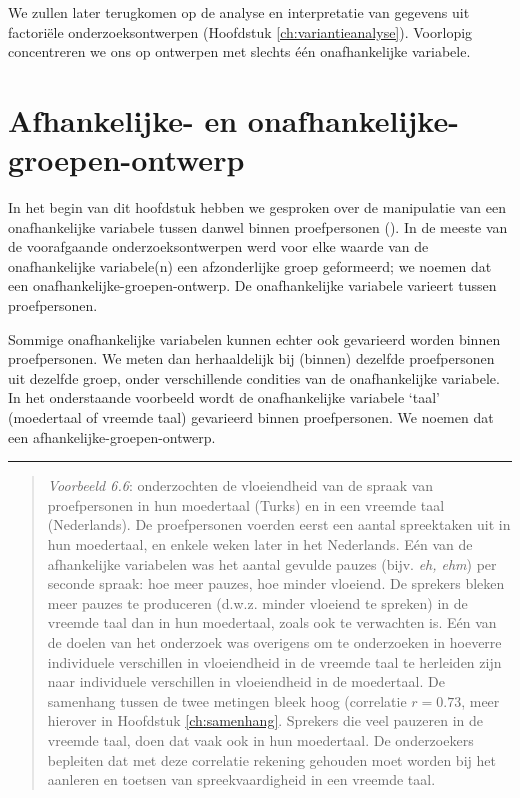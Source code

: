 \documentclass[
]{book}
\begin{document}
We zullen later terugkomen op de analyse en interpretatie van gegevens
uit factoriële onderzoeksontwerpen
(Hoofdstuk \ref{ch:variantieanalyse}). Voorlopig concentreren we ons op
ontwerpen met slechts één onafhankelijke variabele.

\hypertarget{sec:afhankelijkegroepen}{%
\section{Afhankelijke- en onafhankelijke-groepen-ontwerp}\label{sec:afhankelijkegroepen}}

In het begin van dit hoofdstuk hebben we gesproken over de manipulatie
van een onafhankelijke variabele tussen danwel binnen proefpersonen ().
In de meeste van de voorafgaande onderzoeksontwerpen werd voor elke
waarde van de onafhankelijke variabele(n) een afzonderlijke groep
geformeerd; we noemen dat een onafhankelijke-groepen-ontwerp. De
onafhankelijke variabele varieert tussen proefpersonen.

Sommige onafhankelijke variabelen kunnen echter ook gevarieerd worden
binnen proefpersonen. We meten dan herhaaldelijk bij (binnen) dezelfde
proefpersonen uit dezelfde groep, onder verschillende condities van de
onafhankelijke variabele. In het onderstaande voorbeeld wordt de
onafhankelijke variabele `taal' (moedertaal of vreemde taal) gevarieerd
binnen proefpersonen. We noemen dat een afhankelijke-groepen-ontwerp.

\begin{center}\rule{0.5\linewidth}{0.5pt}\end{center}

\begin{quote}
\emph{Voorbeeld 6.6}:
\citep{JGSH13} onderzochten de vloeiendheid van de spraak van proefpersonen in hun
moedertaal (Turks) en in een vreemde taal (Nederlands). De proefpersonen
voerden eerst een aantal spreektaken uit in hun moedertaal, en enkele
weken later in het Nederlands. Eén van de afhankelijke variabelen was
het aantal gevulde pauzes (bijv. \emph{eh, ehm}) per seconde spraak: hoe meer
pauzes, hoe minder vloeiend. De sprekers bleken meer pauzes te
produceren (d.w.z. minder vloeiend te spreken) in de vreemde taal dan in
hun moedertaal, zoals ook te verwachten is. Eén van de doelen van het
onderzoek was overigens om te onderzoeken in hoeverre individuele
verschillen in vloeiendheid in de vreemde taal te herleiden zijn naar
individuele verschillen in vloeiendheid in de moedertaal. De samenhang
tussen de twee metingen bleek hoog (correlatie \(r=0.73\), meer hierover
in Hoofdstuk \ref{ch:samenhang}. Sprekers die veel pauzeren in de vreemde
taal, doen dat vaak ook in hun moedertaal. De onderzoekers bepleiten dat
met deze correlatie rekening gehouden moet worden bij het aanleren en
toetsen van spreekvaardigheid in een vreemde taal.
\end{quote}
\end{document}
